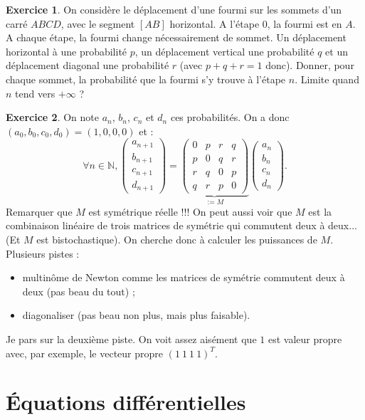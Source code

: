 \documentclass[french]{book}
\newcommand{\N}{\mathbb{N}}
\theoremstyle{definition}
\newtheorem{ex}{Exercice}[chapter]
\theoremstyle{remark}
\begin{document}
\begin{ex}
	On considère le déplacement d'une fourmi sur les sommets d'un carré $ABCD$, avec le segment $[AB]$ horizontal. A l'étape $0$, la fourmi est en $A$. A chaque étape, la fourmi change nécessairement de sommet. Un déplacement horizontal à une probabilité $p$, un déplacement vertical une probabilité $q$ et un déplacement diagonal une probabilité $r$ (avec $p+q+r=1$ donc). Donner, pour chaque sommet, la probabilité que la fourmi s'y trouve à l'étape $n$. Limite quand $n$ tend vers $+\infty$ ?
\end{ex}
\begin{ex}
	On note $a_n$, $b_n$, $c_n$ et $d_n$ ces probabilités. On a donc $(a_0,b_0,c_0,d_0)=(1,0,0,0)$ et :
	$$\forall n\in\N, \begin{pmatrix}
		a_{n+1}\\
		b_{n+1}\\
		c_{n+1}\\
		d_{n+1}
	\end{pmatrix}=\underbrace{\begin{pmatrix}
		0&p&r&q\\
		p&0&q&r\\
		r&q&0&p\\
		q&r&p&0
	\end{pmatrix}}_{:=M}\begin{pmatrix}
		a_n\\
		b_n\\
		c_n\\
		d_n
	\end{pmatrix}.$$
	Remarquer que $M$ est symétrique réelle !!! On peut aussi voir que $M$ est la combinaison linéaire de trois matrices de symétrie qui commutent deux à deux... (Et $M$ est bistochastique). On cherche donc à calculer les puissances de $M$. Plusieurs pistes :
	\begin{itemize}
		\item multinôme de Newton comme les matrices de symétrie commutent deux à deux (pas beau du tout) ;
		\item diagonaliser (pas beau non plus, mais plus faisable).
	\end{itemize}
	Je pars sur la deuxième piste. On voit assez aisément que $1$ est valeur propre avec, par exemple, le vecteur propre $(1\ 1\ 1\ 1)^T$.
\end{ex}

\chapter{Équations différentielles}
\end{document}
